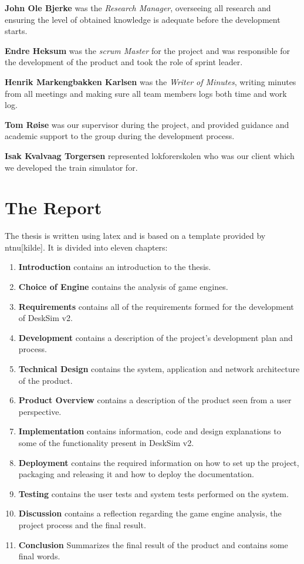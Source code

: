 \textbf{John Ole Bjerke} was the \textit{Research Manager}, overseeing all research and ensuring the level of obtained knowledge is adequate before the development starts.

\textbf{Endre Heksum} was the \textit{\Gls{scrum} Master} for the project and was responsible for the development of the product and took the role of sprint leader.

\textbf{Henrik Markengbakken Karlsen} was the \textit{Writer of Minutes}, writing minutes from all meetings and making sure all team members logs both time and work log.

\textbf{Tom Røise} was our supervisor during the project, and provided guidance and academic support to the group during the development process.

\textbf{Isak Kvalvaag Torgersen} represented \Gls{lokforerskolen} who was our client which we developed the train simulator for. 


\section{The Report}

The thesis is written using latex and is based on a template provided by \acrshort{ntnu}[kilde]. It is divided into eleven chapters:
\begin{enumerate}
    \item \textbf{Introduction} contains an introduction to the thesis. 
    \item \textbf{Choice of Engine} contains the analysis of game engines.
    \item \textbf{Requirements} contains all of the requirements formed for the development of DeskSim v2.
    \item \textbf{Development} contains a description of the project's development plan and process.
    \item \textbf{Technical Design} contains the system, application and network architecture of the product.
    \item \textbf{Product Overview} contains a description of the product seen from a user perspective.
    \item \textbf{Implementation} contains information, code and design explanations to some of the functionality present in DeskSim v2.
    \item \textbf{Deployment} contains the required information on how to set up the project, packaging and releasing it and how to deploy the documentation.
    \item \textbf{Testing} contains the user tests and system tests performed on the system.
    \item \textbf{Discussion} contains a reflection regarding the game engine analysis, the project process and the final result.
    \item \textbf{Conclusion} Summarizes the final result of the product and contains some final words.
\end{enumerate}




